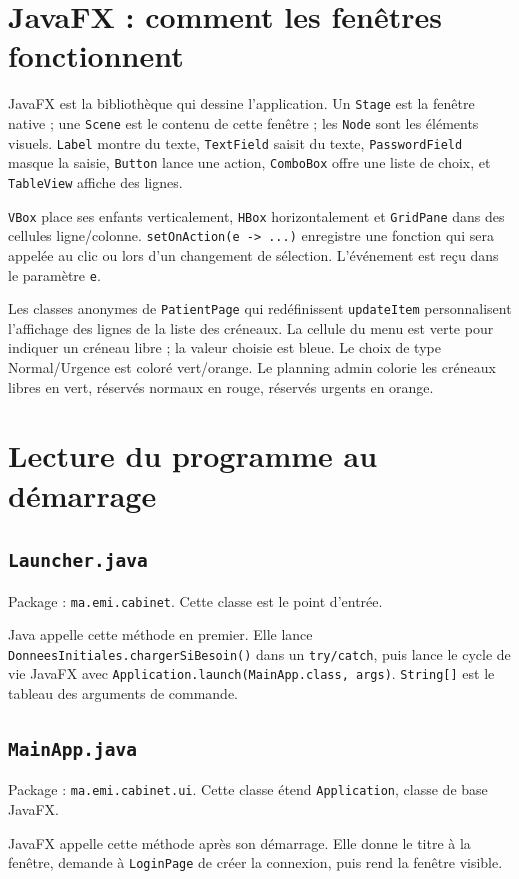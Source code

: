 \documentclass[11pt,a4paper]{report}
\begin{document}
\chapter{JavaFX : comment les fenêtres fonctionnent}
JavaFX est la bibliothèque qui dessine l'application. Un \texttt{Stage} est la fenêtre native ; une \texttt{Scene} est le contenu de cette fenêtre ; les \texttt{Node} sont les éléments visuels. \texttt{Label} montre du texte, \texttt{TextField} saisit du texte, \texttt{PasswordField} masque la saisie, \texttt{Button} lance une action, \texttt{ComboBox} offre une liste de choix, et \texttt{TableView} affiche des lignes.

\texttt{VBox} place ses enfants verticalement, \texttt{HBox} horizontalement et \texttt{GridPane} dans des cellules ligne/colonne. \texttt{setOnAction(e -> ...)} enregistre une fonction qui sera appelée au clic ou lors d'un changement de sélection. L'événement est reçu dans le paramètre \texttt{e}.

Les classes anonymes de \texttt{PatientPage} qui redéfinissent \texttt{updateItem} personnalisent l'affichage des lignes de la liste des créneaux. La cellule du menu est verte pour indiquer un créneau libre ; la valeur choisie est bleue. Le choix de type Normal/Urgence est coloré vert/orange. Le planning admin colorie les créneaux libres en vert, réservés normaux en rouge, réservés urgents en orange.

\chapter{Lecture du programme au démarrage}
\section{\texttt{Launcher.java}}
Package : \texttt{ma.emi.cabinet}. Cette classe est le point d'entrée.
\begin{description}[leftmargin=3.1cm,style=nextline]
\item[\texttt{main(String[] args)}] Java appelle cette méthode en premier. Elle lance \texttt{DonneesInitiales.chargerSiBesoin()} dans un \texttt{try/catch}, puis lance le cycle de vie JavaFX avec \texttt{Application.launch(MainApp.class, args)}. \texttt{String[]} est le tableau des arguments de commande.
\end{description}

\section{\texttt{MainApp.java}}
Package : \texttt{ma.emi.cabinet.ui}. Cette classe étend \texttt{Application}, classe de base JavaFX.
\begin{description}[leftmargin=3.1cm,style=nextline]
\item[\texttt{start(Stage stage)}] JavaFX appelle cette méthode après son démarrage. Elle donne le titre à la fenêtre, demande à \texttt{LoginPage} de créer la connexion, puis rend la fenêtre visible.
\end{description}
\end{document}
